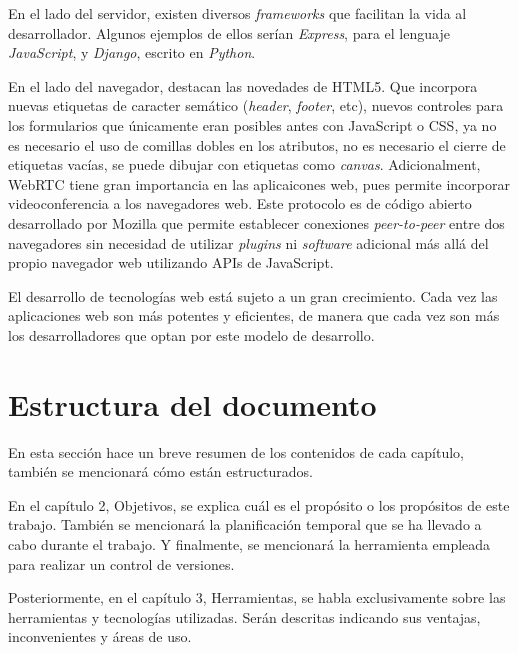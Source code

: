 \documentclass[a4paper, 12pt]{book}
\begin{document}
En el lado del servidor, existen diversos \emph{frameworks} que facilitan la vida al desarrollador. Algunos ejemplos de ellos serían \emph{Express}, para el lenguaje \emph{JavaScript}, y \emph{Django}, escrito en \emph{Python}.

En el lado del navegador, destacan las novedades de HTML5. Que incorpora nuevas etiquetas de caracter semático (\emph{header}, \emph{footer}, etc), nuevos controles para los formularios que únicamente eran posibles antes con JavaScript o CSS, ya no es necesario el uso de comillas dobles en los atributos, no es necesario el cierre de etiquetas vacías, se puede dibujar con etiquetas como \emph{canvas}. Adicionalment, WebRTC tiene gran importancia en las aplicaicones web, pues permite incorporar videoconferencia a los navegadores web. Este protocolo es de código abierto desarrollado por Mozilla que permite establecer conexiones \emph{peer-to-peer} entre dos navegadores sin necesidad de utilizar \emph{plugins} ni \emph{software} adicional más allá del propio navegador web utilizando APIs de JavaScript.

El desarrollo de tecnologías web está sujeto a un gran crecimiento. Cada vez las aplicaciones web son más potentes y eficientes, de manera que cada vez son más los desarrolladores que optan por este modelo de desarrollo.


\section{Estructura del documento}

En esta sección hace un breve resumen de los contenidos de cada capítulo, también se mencionará cómo están estructurados.

En el capítulo 2, Objetivos, se explica cuál es el propósito o los propósitos de este trabajo. También se mencionará la planificación temporal que se ha llevado a cabo durante el trabajo. Y finalmente, se mencionará la herramienta empleada para realizar un control de versiones.

Posteriormente, en el capítulo 3, Herramientas, se habla exclusivamente sobre las herramientas y tecnologías utilizadas. Serán descritas indicando sus ventajas, inconvenientes y áreas de uso.
\end{document}
